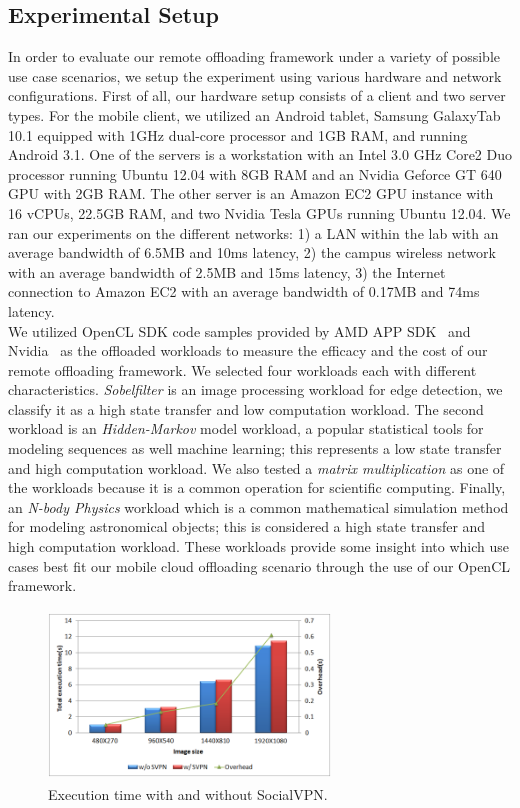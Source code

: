 \documentclass[10pt, conference, compsocconf]{IEEEtran}
\begin{document}
\subsection{Experimental Setup}
%
In order to evaluate our remote offloading framework under a variety of 
possible use case scenarios, we setup the experiment using various hardware
and network configurations.
%
First of all, our hardware setup consists of a client and two server types.
%
For the mobile client, we utilized an Android tablet, Samsung GalaxyTab 10.1 
equipped with 1GHz dual-core processor and 1GB RAM, and running Android 3.1.
%
One of the servers is a workstation with an Intel 3.0 GHz Core2 Duo
processor running Ubuntu 12.04 with 8GB RAM and an Nvidia Geforce GT 640
GPU with 2GB RAM.
%
The other server is an Amazon EC2 GPU instance with 16 vCPUs, 22.5GB RAM,
and two Nvidia Tesla GPUs running Ubuntu 12.04.
%
We ran our experiments on the different networks: 1) a LAN within the lab
with an average bandwidth of 6.5MB and 10ms latency, 2) the campus
wireless network with an average bandwidth of 2.5MB and 15ms latency,
3) the Internet connection to Amazon EC2 with an average bandwidth of
0.17MB and 74ms latency.\\
%
\indent We utilized OpenCL SDK code samples provided by AMD APP SDK~\cite{amd} and 
Nvidia~\cite{nvidia} as the offloaded workloads to measure the efficacy and the cost
of our remote offloading framework.
%
We selected four workloads each with different characteristics.
%
\textit{Sobelfilter} is an image processing workload for edge detection, we
classify it as a high state transfer and low computation workload.
%
The second workload is an \textit{Hidden-Markov} model workload, a popular
statistical tools for modeling sequences as well machine learning;
this represents a low state transfer and high computation workload.
%
We also tested a \textit{matrix multiplication} as one of the workloads because
it is a common operation for scientific computing.
%
Finally, an \textit{N-body Physics} workload which is a common
mathematical simulation method for modeling astronomical objects;
this is considered a high state transfer and high computation workload.
%
These workloads provide some insight into which use cases best fit our
mobile cloud offloading scenario through the use of our OpenCL framework.
%
\begin{figure}
\centering
\includegraphics[height=4.5cm, width=7.5cm]{Figure/svpn1}
\caption{Execution time with and without SocialVPN.
}
\end{figure}
\end{document}
